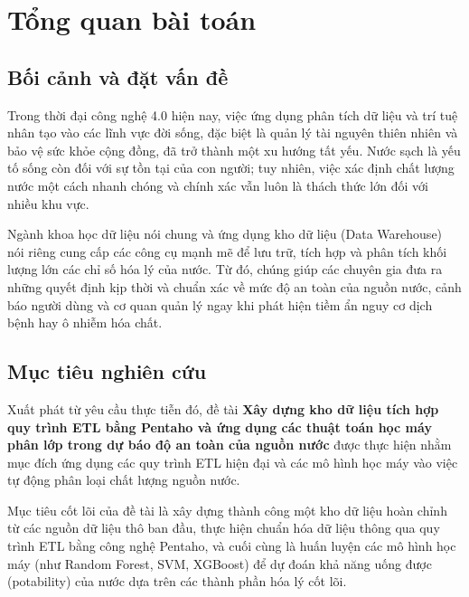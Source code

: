\section{Tổng quan bài toán}
\subsection{Bối cảnh và đặt vấn đề}
\hspace{17pt}Trong thời đại công nghệ 4.0 hiện nay, việc ứng dụng phân tích dữ liệu và trí tuệ nhân tạo vào các lĩnh vực đời sống, đặc biệt là quản lý tài nguyên thiên nhiên và bảo vệ sức khỏe cộng đồng, đã trở thành một xu hướng tất yếu. Nước sạch là yếu tố sống còn đối với sự tồn tại của con người; tuy nhiên, việc xác định chất lượng nước một cách nhanh chóng và chính xác vẫn luôn là thách thức lớn đối với nhiều khu vực. 

\hspace{17pt}Ngành khoa học dữ liệu nói chung và ứng dụng kho dữ liệu (Data Warehouse) nói riêng cung cấp các công cụ mạnh mẽ để lưu trữ, tích hợp và phân tích khối lượng lớn các chỉ số hóa lý của nước. Từ đó, chúng giúp các chuyên gia đưa ra những quyết định kịp thời và chuẩn xác về mức độ an toàn của nguồn nước, cảnh báo người dùng và cơ quan quản lý ngay khi phát hiện tiềm ẩn nguy cơ dịch bệnh hay ô nhiễm hóa chất.

\subsection{Mục tiêu nghiên cứu}
\hspace{17pt}Xuất phát từ yêu cầu thực tiễn đó, đề tài \textbf{Xây dựng kho dữ liệu tích hợp quy trình ETL bằng Pentaho và ứng dụng các thuật toán học máy phân lớp trong dự báo độ an toàn của nguồn nước} được thực hiện nhằm mục đích ứng dụng các quy trình ETL hiện đại và các mô hình học máy vào việc tự động phân loại chất lượng nguồn nước. 

\hspace{17pt}Mục tiêu cốt lõi của đề tài là xây dựng thành công một kho dữ liệu hoàn chỉnh từ các nguồn dữ liệu thô ban đầu, thực hiện chuẩn hóa dữ liệu thông qua quy trình ETL bằng công nghệ Pentaho, và cuối cùng là huấn luyện các mô hình học máy (như Random Forest, SVM, XGBoost) để dự đoán khả năng uống được (potability) của nước dựa trên các thành phần hóa lý cốt lõi. 

